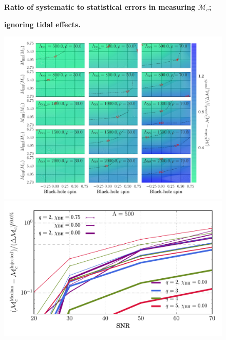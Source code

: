 \documentclass[aps,prd,amsmath,floats,floatfix, twocolumn,
superscriptaddress,nofootinbib,showpacs]{revtex4-1}
\newcommand{\lambdans}{\Lambda_\mathrm{NS}}
\newcommand{\mchirp}{\mathcal{M}_c}
\begin{document}
% 
\begin{figure}
\centering 
\textbf{Ratio of systematic to statistical errors in measuring $\mchirp$;}\par
\textbf{ignoring tidal effects.}\par\medskip
\includegraphics[width=1.6\columnwidth]{plots/TNMchirpBiasesOverCIWidths_CI90_0_Lambda_SNR30_70_linear}
\includegraphics[width=0.8\columnwidth]{plots/TNMchirpBiasesOverCIWidthsVsSNR_Lambda500_CI90_0}

\end{figure}
\end{document}
